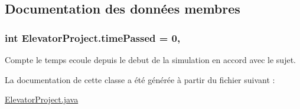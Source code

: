 \subsection{Documentation des données membres}
\hypertarget{classElevatorProject_ab748dd5a6fb42b4c2b83d4e6ad3138ba}{
\subsubsection[{time\-Passed}]{\setlength{\rightskip}{0pt plus 5cm}int Elevator\-Project.\-time\-Passed = 0\hspace{0.3cm}{\ttfamily [static]}, {\ttfamily [package]}}}\label{classElevatorProject_ab748dd5a6fb42b4c2b83d4e6ad3138ba}


Compte le temps ecoule depuis le debut de la simulation en accord avec le sujet. 



La documentation de cette classe a été générée à partir du fichier suivant \-:\begin{DoxyCompactItemize}
\item 
\hyperlink{ElevatorProject_8java}{Elevator\-Project.\-java}\end{DoxyCompactItemize}
